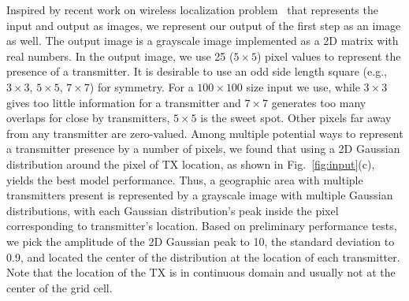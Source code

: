 Inspired by recent work on wireless localization problem~\cite{mobicom20-deeploc} that represents the input and output as images, we represent our output of the first step as an image as well.
The output image is a grayscale image implemented as a 2D matrix with real numbers. 
In the output image, we use 25 ($5\times 5$) pixel values to represent the presence of a transmitter. 
It is desirable to use an odd side length square (e.g., $3\times 3$, $5\times5$, $7\times 7$) for symmetry. 
For a $100\times 100$ size input we use, while $3\times3$ gives too little information for a transmitter and $7\times 7$ generates too many overlaps for close by transmitters, $5\times 5$ is the sweet spot.
Other pixels far away from any transmitter are zero-valued.
Among multiple potential ways to represent a transmitter presence by a number of pixels, we found
that using a 2D Gaussian distribution around the pixel of TX location, as shown in Fig.~\ref{fig:input}(c), yields the best model performance.
Thus, a geographic area with multiple transmitters present is represented by a grayscale image with multiple Gaussian distributions, with each Gaussian distribution's peak inside the pixel corresponding to transmitter's location. 
Based on preliminary performance
tests, we pick the amplitude of the 2D Gaussian peak to 10, the standard deviation to 0.9, and located the center of the distribution at the location of each transmitter.
Note that the location of the TX is in continuous domain and usually not at the center of the grid cell.



